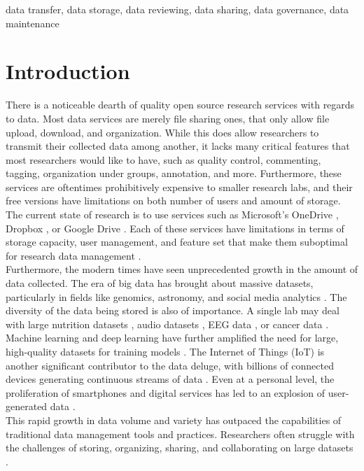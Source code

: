 \documentclass[conference]{IEEEtran}
\begin{document}
\begin{IEEEkeywords}
data transfer, data storage, data reviewing, data sharing, data governance, data maintenance
\end{IEEEkeywords}

\section{Introduction}
There is a noticeable dearth of quality open source research services with regards to data.
Most data services are merely file sharing ones, that only allow file upload, download, and organization.
While this does allow researchers to transmit their collected data among another,
it lacks many critical features that most researchers would like to have, such as
quality control, commenting, tagging, organization under groups, annotation, and more.
Furthermore, these services are oftentimes prohibitively expensive to smaller research labs, and their
free versions have limitations on both number of users and amount of storage.
The current state of research is to use services such as Microsoft's OneDrive \cite{onedrive}, Dropbox \cite{dropbox},
or Google Drive \cite{googledrive}. Each of these services have limitations in terms of storage capacity, user management,
and feature set that make them suboptimal for research data management \cite{kowalczyk2018data}.
\\
Furthermore, the modern times have seen unprecedented growth in the amount of data collected.
The era of big data has brought about massive datasets, particularly in fields like genomics, astronomy, and social media analytics \cite{stephens2015big}. 
The diversity of the data being stored is also of importance. A single lab may deal with large nutrition datasets \cite{foodData}, audio datasets \cite{wordification}, EEG data \cite{eeg}, or cancer data \cite{cancer}.
Machine learning and deep learning have further amplified the need for large, high-quality datasets for training models \cite{sun2017revisiting}.
The Internet of Things (IoT) is another significant contributor to the data deluge, with billions of connected devices generating continuous streams of data \cite{khan2018iot}.
Even at a personal level, the proliferation of smartphones and digital services has led to an explosion of user-generated data \cite{reinsel2018digitization}.
\\
This rapid growth in data volume and variety has outpaced the capabilities of traditional data management tools and practices.
Researchers often struggle with the challenges of storing, organizing, sharing, and collaborating on large datasets \cite{wallis2013if}.
\end{document}
